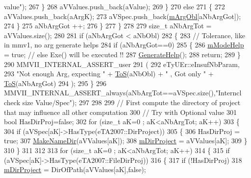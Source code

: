 \begin{DoxyCode}
{       value"});
267              \}
268              aVValues.push\_back(aValue);
269           \}
270           \textcolor{keywordflow}{else}
271           \{
272              aVValues.push\_back(aArgK);
273              aVSpec.push\_back(\hyperlink{classMMVII_1_1cMMVII__Appli_a86f7322447bc62804d397f01b9e346c7}{mArgObl}[aNbArgGot]);
274           \}
275           aNbArgGot ++;
276       \}
277   \}
278 
279   \textcolor{keywordtype}{size\_t} aNbArgTot = aVValues.size();
280 
281   \textcolor{keywordflow}{if} (aNbArgGot < aNbObl)
282   \{
283       \textcolor{comment}{// Tolerance, like in mmv1, no arg generate helps}
284       \textcolor{keywordflow}{if} (aNbArgGot==0)
285       \{
286          \hyperlink{classMMVII_1_1cMMVII__Appli_a7b234837f88b35c6067d5dbcff9d6db3}{mModeHelp} = \textcolor{keyword}{true};  \textcolor{comment}{// else Exe() will be executed !!}
287          \hyperlink{classMMVII_1_1cMMVII__Appli_ae11b4082949e6e783025f17ee02bf317}{GenerateHelp}();
288          \textcolor{keywordflow}{return};
289       \}
290       MMVII\_INTERNAL\_ASSERT\_user
291       (
292           eTyUEr::eInsufNbParam,
293           \textcolor{stringliteral}{"Not enough Arg, expecting "} + \hyperlink{MMVII__Stringifier_8h_a64a1308bcc78f0e43e7fc6ff36934e9f}{ToS}(aNbObl)  + \textcolor{stringliteral}{" , Got only "} +  \hyperlink{MMVII__Stringifier_8h_a64a1308bcc78f0e43e7fc6ff36934e9f}{ToS}(aNbArgGot)
294       );
295   \}
296   MMVII\_INTERNAL\_ASSERT\_always(aNbArgTot==aVSpec.size(),\textcolor{stringliteral}{"Interncl check size Value/Spec"});
297 
298 
299   \textcolor{comment}{// First compute the directory of project that may influence all other computation}
300      \textcolor{comment}{// Try with Optional value}
301   \textcolor{keywordtype}{bool} HasDirProj=\textcolor{keyword}{false};
302   \textcolor{keywordflow}{for} (\textcolor{keywordtype}{size\_t} aK=0 ; aK<aNbArgTot; aK++)
303   \{
304      \textcolor{keywordflow}{if} (aVSpec[aK]->HasType(eTA2007::DirProject))
305      \{
306         HasDirProj = \textcolor{keyword}{true};
307         \hyperlink{uti__string_8cpp_a2ba1810dc4ff3d1e00bede52d97a5f6b}{MakeNameDir}(aVValues[aK]);
308         \hyperlink{classMMVII_1_1cMMVII__Appli_ac499a1136b5261fb82e1ac0fb9632fdc}{mDirProject} = aVValues[aK];
309      \}
310   \}
311 
312   
313   \textcolor{keywordflow}{for} (\textcolor{keywordtype}{size\_t} aK=0 ; aK<aNbArgTot; aK++)
314   \{
315      \textcolor{keywordflow}{if} (aVSpec[aK]->HasType(eTA2007::FileDirProj))
316      \{
317         \textcolor{keywordflow}{if} (!HasDirProj)
318            \hyperlink{classMMVII_1_1cMMVII__Appli_ac499a1136b5261fb82e1ac0fb9632fdc}{mDirProject} = DirOfPath(aVValues[aK],\textcolor{keyword}{false});

\end{DoxyCode}

